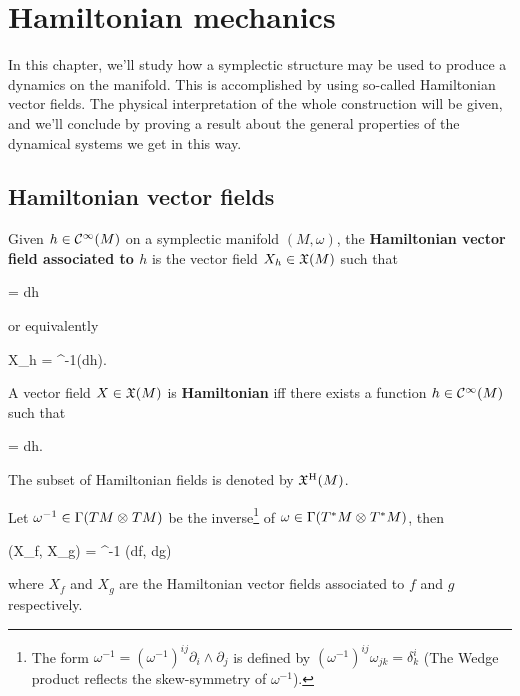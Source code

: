 \documentclass[main.tex]{subfiles}
\begin{document}
\chapter{Hamiltonian mechanics}
In this chapter, we'll study how a symplectic structure may be used to produce a dynamics on the manifold. This is accomplished by using so-called Hamiltonian vector fields. The physical interpretation of the whole construction will be given, and we'll conclude by proving a result about the general properties of the dynamical systems we get in this way.

\section{Hamiltonian vector fields}
\begin{definition}
	Given $h \in \mathcal{C}^\infty(M)$ on a symplectic manifold $(M, \omega)$, the \textbf{Hamiltonian vector field associated to $h$} is the vector field $X_h \in \mathfrak{X}(M)$ such that
	\begin{eqalign}
		 \omega = dh
	\end{eqalign}
	or equivalently\footnotemark
	\begin{eqalign}
	\label{eq:ass_ham_vec_field}
		X_h = \omega^{-1}(dh).
	\end{eqalign}
\end{definition}

\begin{definition}
	A vector field $X \in \mathfrak{X}(M)$ is \textbf{Hamiltonian} iff there exists a function $h \in \mathcal{C}^\infty(M)$ such that
	\begin{eqalign}
		 \omega = dh.
	\end{eqalign}
	The subset of Hamiltonian fields is denoted by $\mathfrak{X}^{\mathrm{H}}(M)$.
\end{definition}

\begin{remark}
	Let $\omega^{-1} \in \Gamma(TM \otimes_{} TM)$ be the inverse\footnote{The form $\omega^{-1} = (\omega^{-1})^{ij} \partial_i \wedge \partial_j$ is defined by $(\omega^{-1})^{ij} \omega_{jk} = \delta^i_k$ (The Wedge product reflects the skew-symmetry of $\omega^{-1}$).} of $\omega \in \Gamma(T^*M \otimes_{} T^*M)$, then
	\begin{eqalign}
	\label{eq:inv_sym_form_Ham_fields}
		\omega(X_f, X_g) = \omega^{-1} (df, dg)
	\end{eqalign}
	where $X_f$ and $X_g$ are the Hamiltonian vector fields associated to $f$ and $g$ respectively.
\end{remark}
\end{document}
